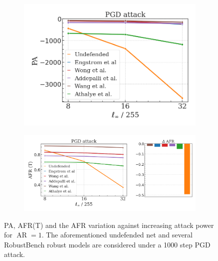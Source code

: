 \begin{figure}[H]
    \centering
    \begin{subfigure}[b]{0.37\textwidth}
        \centering
        \includegraphics[width=\textwidth]{img/results_discussion/adversarial/PGD_logPA_eps.png}
    \end{subfigure}
    \hfill
    \begin{subfigure}[b]{0.59\textwidth}
        \centering
        \includegraphics[width=\textwidth]{img/results_discussion/adversarial/PGD_AFR_true_eps_diff.png}
    \end{subfigure}
    \caption{PA, AFR(T) and the AFR variation against increasing attack power for  $\operatorname{AR} = 1$. 
    The aforementioned undefended net and several RobustBench robust models are considered
    under a 1000 step PGD attack.}
    \label{fig:pgd_eps}
\end{figure}

